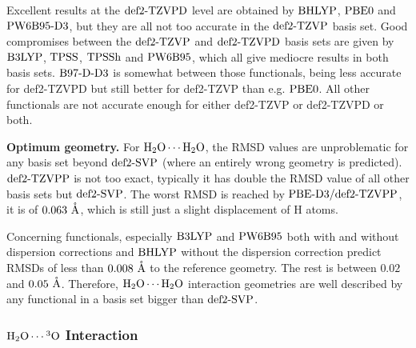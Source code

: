 Excellent results at the $\text{def2-TZVPD}$ level are obtained by $\text{BHLYP}$, $\text{PBE0}$ and
$\text{PW6B95}\text{-D3}$, but they are all not too accurate in the $\text{def2-TZVP}$ basis set.  
Good compromises between the $\text{def2-TZVP}$ and $\text{def2-TZVPD}$ basis sets
are given by $\text{B3LYP}$, $\text{TPSS}$, $\text{TPSSh}$ and $\text{PW6B95}$, which all give
mediocre results in both basis sets. 
$\text{B97-D}\text{-D3}$ is somewhat
between those functionals, being less accurate for def2-TZVPD but still better
for def2-TZVP than e.g. $\text{PBE0}$. All other functionals are not accurate enough
for either def2-TZVP or def2-TZVPD or both.

\textbf{Optimum geometry.} For $\mbox{\ensuremath{\text H _2 \text O \cdots \text H _2 \text O}}$, the RMSD values are 
unproblematic for any basis set beyond $\text{def2-SVP}$ (where an entirely wrong geometry
is predicted). $\text{def2-TZVPP}$ is not too exact, typically it has double the
RMSD value of all other basis sets but $\text{def2-SVP}$. The worst RMSD is reached by
$\text{PBE}\text{-D3}/\text{def2-TZVPP}$, it is of \mbox{$0.063\ \mathring{\text{A}}$}, which is still just a slight
displacement of H atoms.

Concerning functionals, especially $\text{B3LYP}$ and $\text{PW6B95}$ both with
and without dispersion corrections and $\text{BHLYP}$ without the dispersion
correction predict RMSDs of less than $0.008\ \mathring{\text{A}}$ to the reference geometry.
The rest is between $0.02$ and $0.05\ \mathring{\text{A}}$. Therefore, $\mbox{\ensuremath{\text H _2 \text O \cdots \text H _2 \text O}}$ interaction
geometries are well described by any functional in a basis set bigger than
$\text{def2-SVP}$.


\subsubsection{$\mbox{\ensuremath{\text H _2 \text O \cdots \hspace{.2pt} ^3\text{O}}}$ Interaction}



